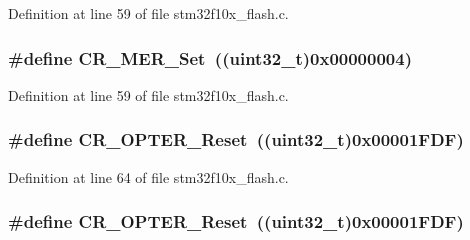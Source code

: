 Definition at line 59 of file stm32f10x\+\_\+flash.\+c.

\subsubsection[{\texorpdfstring{C\+R\+\_\+\+M\+E\+R\+\_\+\+Set}{CR_MER_Set}}]{\setlength{\rightskip}{0pt plus 5cm}\#define C\+R\+\_\+\+M\+E\+R\+\_\+\+Set~(({\bf uint32\+\_\+t})0x00000004)}\hypertarget{group___f_l_a_s_h___private___defines_ga7e5cf18b31b5ed960cd05a816cadf973}{}\label{group___f_l_a_s_h___private___defines_ga7e5cf18b31b5ed960cd05a816cadf973}


Definition at line 59 of file stm32f10x\+\_\+flash.\+c.

\subsubsection[{\texorpdfstring{C\+R\+\_\+\+O\+P\+T\+E\+R\+\_\+\+Reset}{CR_OPTER_Reset}}]{\setlength{\rightskip}{0pt plus 5cm}\#define C\+R\+\_\+\+O\+P\+T\+E\+R\+\_\+\+Reset~(({\bf uint32\+\_\+t})0x00001\+F\+D\+F)}\hypertarget{group___f_l_a_s_h___private___defines_ga0245cfe194895f1ad98ba66f8eda3e47}{}\label{group___f_l_a_s_h___private___defines_ga0245cfe194895f1ad98ba66f8eda3e47}


Definition at line 64 of file stm32f10x\+\_\+flash.\+c.

\subsubsection[{\texorpdfstring{C\+R\+\_\+\+O\+P\+T\+E\+R\+\_\+\+Reset}{CR_OPTER_Reset}}]{\setlength{\rightskip}{0pt plus 5cm}\#define C\+R\+\_\+\+O\+P\+T\+E\+R\+\_\+\+Reset~(({\bf uint32\+\_\+t})0x00001\+F\+D\+F)}\hypertarget{group___f_l_a_s_h___private___defines_ga0245cfe194895f1ad98ba66f8eda3e47}{}\label{group___f_l_a_s_h___private___defines_ga0245cfe194895f1ad98ba66f8eda3e47}


